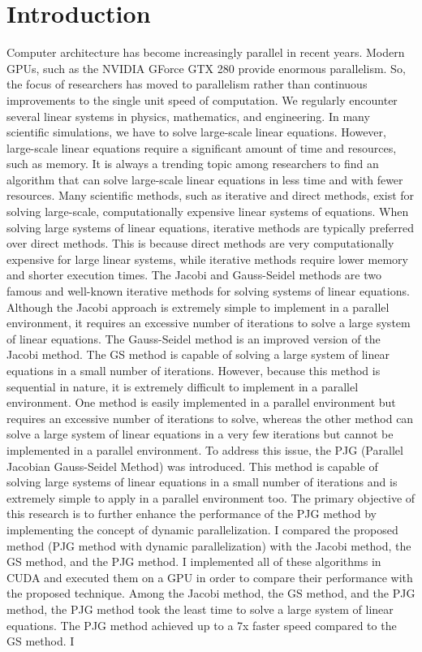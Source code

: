 \documentclass[11pt]{article}       %
\begin{document}
\section{Introduction} \label{introduction}

Computer architecture has become increasingly parallel in recent years. Modern GPUs, such as the NVIDIA GForce GTX 280 provide enormous parallelism. So, the focus of researchers has moved to parallelism rather than continuous improvements to the single unit speed of computation. We regularly encounter several linear systems in physics, mathematics, and engineering. In many scientific simulations, we have to solve large-scale linear equations. However, large-scale linear equations require a significant amount of time and resources, such as memory. It is always a trending topic among researchers to find an algorithm that can solve large-scale linear equations in less time and with fewer resources. Many scientific methods, such as iterative and direct methods, exist for solving large-scale, computationally expensive linear systems of equations. When solving large systems of linear equations, iterative methods are typically preferred over direct methods. This is because direct methods are very computationally expensive for large linear systems, while iterative methods require lower memory and shorter execution times. The Jacobi and Gauss-Seidel methods are two famous and well-known iterative methods for solving systems of linear equations. Although the Jacobi approach is extremely simple to implement in a parallel environment, it requires an excessive number of iterations to solve a large system of linear equations. The Gauss-Seidel method is an improved version of the Jacobi method. The GS method is capable of solving a large system of linear equations in a small number of iterations. However, because this method is sequential in nature, it is extremely difficult to implement in a parallel environment. One method is easily implemented in a parallel environment but requires an excessive number of iterations to solve, whereas the other method can solve a large system of linear equations in a very few iterations but cannot be implemented in a parallel environment. To address this issue, the PJG (Parallel Jacobian Gauss-Seidel Method) was introduced. This method is capable of solving large systems of linear equations in a small number of iterations and is extremely simple to apply in a parallel environment too. The primary objective of this research is to further enhance the performance of the PJG method by implementing the concept of dynamic parallelization. I compared the proposed method (PJG method with dynamic parallelization) with the Jacobi method, the GS method, and the PJG method. I implemented all of these algorithms in CUDA and executed them on a GPU in order to compare their performance with the proposed technique. Among the Jacobi method, the GS method, and the PJG method, the PJG method took the least time to solve a large system of linear equations. The PJG method achieved up to a 7x faster speed compared to the GS method. I 
\end{document}
